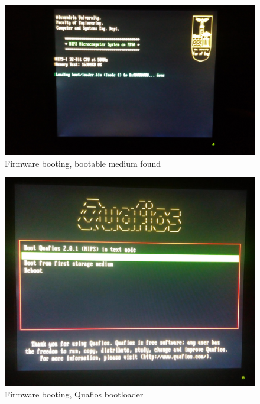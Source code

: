 \documentclass[oneside]{book}
\begin{document}
\begin{figure}
\begin{center}
\includegraphics[width=20cm]{res_bios2.jpg}
\end{center}
\caption{Firmware booting, bootable medium found}
\end{figure}

\begin{figure}
\begin{center}
\includegraphics[width=20cm]{res_bootloader.jpg}
\end{center}
\caption{Firmware booting, Quafios bootloader}
\end{figure}
\end{document}
